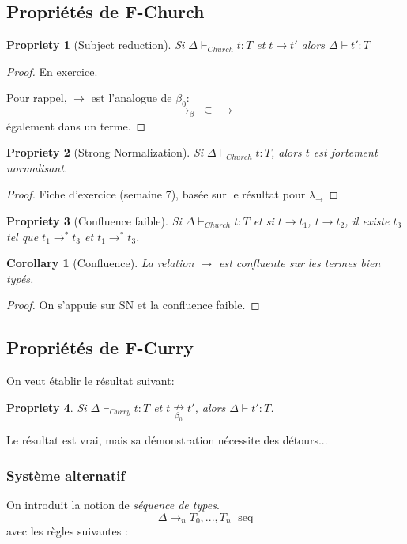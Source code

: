 \documentclass{article}
\newtheorem{prop}{Propriety}
\newtheorem{coro}{Corollary}
\newcommand\seq[0]{\text{ seq}}
\begin{document}
\subsection{Propriétés de F-Church}
\begin{prop}[Subject reduction]
Si $\Delta \vdash_{Church} t:T$ et $t\to t'$ alors $\Delta \vdash t' : T$
\end{prop}

\begin{proof}
En exercice.

Pour rappel, $\to$ est l'analogue de $\beta_0$:\[\to_\beta \; \subseteq \; \to\]
également dans un terme.
\end{proof}

\begin{prop}[Strong Normalization]
Si $\Delta \vdash_{Church} t : T$, alors $t$ est fortement normalisant.
\end{prop}
\begin{proof}
Fiche d'exercice (semaine 7), basée sur le résultat pour $\lambda_\to$
\end{proof}

\begin{prop}[Confluence faible]
Si $\Delta \vdash_{Church} t:T$ et si $t\to t_1$, $t\to t_2$, il existe $t_3$ tel que $t_1\to^*t_3$ et $t_1\to^*t_3$.
\end{prop}

\begin{coro}[Confluence]
La relation $\to$ est confluente sur les termes bien typés.
\end{coro}

\begin{proof}
On s'appuie sur SN et la confluence faible.
\end{proof}


\subsection{Propriétés de F-Curry}
On veut établir le résultat suivant:
\begin{prop}
Si $\Delta \vdash_{Curry}t:T$ et $t\underset{\beta_0}{\nrightarrow} t'$, alors $\Delta \vdash t' : T$.
\end{prop}
Le résultat est vrai, mais sa démonstration nécessite des détours...


\subsubsection{Système alternatif}
On introduit la notion de \emph{séquence de types}.
\[\Delta \to_n T_0,...,T_n \; \seq\]
avec les règles suivantes :
\end{document}
